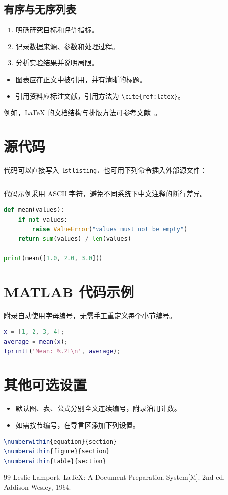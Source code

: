 \documentclass[UTF8,a4paper,zihao=-4,fontset=fandol]{ctexart}
\begin{document}
\subsection{有序与无序列表}
\begin{enumerate}
  \item 明确研究目标和评价指标。
  \item 记录数据来源、参数和处理过程。
  \item 分析实验结果并说明局限。
\end{enumerate}
\begin{itemize}
  \item 图表应在正文中被引用，并有清晰的标题。
  \item 引用资料应标注文献，引用方法为 \verb|\cite{ref:latex}|。
\end{itemize}
例如，LaTeX 的文档结构与排版方法可参考文献~\cite{ref:latex}。

\section{源代码}
代码可以直接写入 \texttt{lstlisting}，也可用下列命令插入外部源文件：
\begin{lstlisting}[language=TeX,numbers=none]

\end{lstlisting}
代码示例采用 ASCII 字符，避免不同系统下中文注释的断行差异。
\begin{lstlisting}[language=Python,caption={Python 示例},label={lst:python}]
def mean(values):
    if not values:
        raise ValueError("values must not be empty")
    return sum(values) / len(values)

print(mean([1.0, 2.0, 3.0]))
\end{lstlisting}

\clearpage
\appendix
\section{MATLAB 代码示例}
附录自动使用字母编号，无需手工重定义每个小节编号。
\begin{lstlisting}[language=Matlab,caption={MATLAB 示例}]
x = [1, 2, 3, 4];
average = mean(x);
fprintf('Mean: %.2f\n', average);
\end{lstlisting}

\section{其他可选设置}
\begin{itemize}
  \item 默认图、表、公式分别全文连续编号，附录沿用计数。
  \item 如需按节编号，在导言区添加下列设置。
\end{itemize}
\begin{lstlisting}[language=TeX,numbers=none]
\numberwithin{equation}{section}
\numberwithin{figure}{section}
\numberwithin{table}{section}
\end{lstlisting}

\clearpage
{}
\begin{thebibliography}{99}
   Leslie Lamport. LaTeX: A Document Preparation System[M].
    2nd ed. Addison-Wesley, 1994.
\end{thebibliography}
\end{document}
